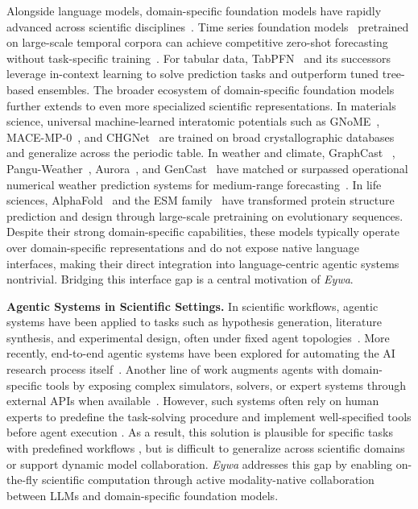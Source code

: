 Alongside language models, domain-specific foundation models have rapidly advanced across scientific disciplines~\cite{DBLP:journals/nn/MenonMBPJKJ26,DBLP:journals/corr/abs-2108-07258}.
Time series foundation models~\cite{DBLP:journals/tmlr/AnsariSTZMSSRPK24,DBLP:conf/icml/DasKSZ24, DBLP:conf/icml/WooLKXSS24,DBLP:journals/corr/abs-2310-08278} pretrained on large-scale temporal corpora can achieve competitive zero-shot forecasting without task-specific training~\cite{DBLP:journals/corr/abs-2504-04011}.
For tabular data, TabPFN~\cite{DBLP:conf/iclr/Hollmann0EH23} and its successors~\cite{DBLP:journals/nature/HollmannMPKKHSH25,DBLP:journals/corr/abs-2511-08667} leverage in-context learning to solve prediction tasks and outperform tuned tree-based ensembles.
The broader ecosystem of domain-specific foundation models further extends to even more specialized scientific representations. In materials science, universal machine-learned interatomic potentials such as GNoME~\cite{merchant2023scaling}, MACE-MP-0~\cite{batatia2025foundation}, and CHGNet~\cite{DBLP:journals/natmi/DengZJRHBC23} are trained on broad crystallographic databases and generalize across the periodic table.
In weather and climate, GraphCast ~\cite{DBLP:journals/corr/abs-2212-12794}, Pangu-Weather~\cite{journals/nature/BiXZCG023}, Aurora~\cite{DBLP:journals/nature/BodnarBLSABGRWD25}, and GenCast~\cite{DBLP:journals/nature/PriceSAAEMESMBLW25} have matched or surpassed operational numerical weather prediction systems for medium-range forecasting~\cite{DBLP:journals/corr/abs-2312-03014}.
In life sciences, AlphaFold~\cite{jumper2021highly} and the ESM family~\cite{lin2023evolutionary,hayes2025simulating} have transformed protein structure prediction and design through large-scale pretraining on evolutionary sequences.
Despite their strong domain-specific capabilities, these models typically operate over domain-specific representations and do not expose native language interfaces, making their direct integration into language-centric agentic systems nontrivial. Bridging this interface gap is a central motivation of \textit{Eywa}.


\textbf{Agentic Systems in Scientific Settings.}
In scientific workflows, agentic systems have been applied to tasks such as hypothesis generation, literature synthesis, and experimental design, often under fixed agent topologies~\cite{wei2025ai,ghafarollahi2025sciagents,liu2025genomas}.
More recently, end-to-end agentic systems have been explored for automating the AI research process itself~\cite{lu2026towards}.
Another line of work augments agents with domain-specific tools by exposing complex simulators, solvers, or expert systems through external APIs when available~\cite{kim-etal-2025-mt,inoue2025drugagent}.
However, such systems often rely on human experts to predefine the task-solving procedure and implement well-specified tools before agent execution \cite{DBLP:conf/naacl/YuanSCTSRLY25}.
As a result, this solution is plausible for specific tasks with predefined workflows \cite{DBLP:journals/corr/abs-2510-04017}, but is difficult to generalize across scientific domains or support dynamic model collaboration.
\textit{Eywa} addresses this gap by enabling on-the-fly scientific computation through active modality-native collaboration between LLMs and domain-specific foundation models.